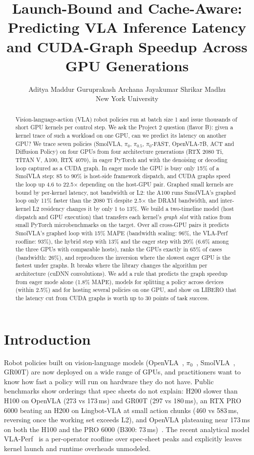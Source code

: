 \documentclass[10pt,twocolumn]{article}
\title{Launch-Bound and Cache-Aware: Predicting VLA Inference Latency\\
and CUDA-Graph Speedup Across GPU Generations}
\author{Aditya Maddur Guruprakash \quad Archana Jayakumar \quad Shrikar Madhu\\New York University}
\date{}
\begin{document}
\maketitle

\begin{abstract}
Vision-language-action (VLA) robot policies run at batch size 1 and issue thousands of short
GPU kernels per control step. We ask the Project 2 question (flavor B): given a kernel trace of
such a workload on one GPU, can we predict its latency on another GPU? We trace seven policies
(SmolVLA, $\pi_0$, $\pi_{0.5}$, $\pi_0$-FAST, OpenVLA-7B, ACT and Diffusion Policy) on four GPUs
from four architecture generations (RTX 2080 Ti, TITAN V, A100, RTX 4070), in eager PyTorch and
with the denoising or decoding loop captured as a CUDA graph. In eager mode the GPU is busy only
15\% of a SmolVLA step: 85 to 90\% is host-side framework dispatch, and CUDA graphs speed the
loop up 4.6 to 22.5$\times$ depending on the host-GPU pair. Graphed small kernels are bound by
per-kernel latency, not bandwidth or L2: the A100 runs SmolVLA's graphed loop only 11\% faster
than the 2080 Ti despite 2.5$\times$ the DRAM bandwidth, and inter-kernel L2 residency changes it
by only 1 to 13\%. We build a two-timeline model (host dispatch and GPU execution) that transfers
each kernel's \emph{graph slot} with ratios from small PyTorch microbenchmarks on the target.
Over all cross-GPU pairs it predicts SmolVLA's graphed loop with 15\% MAPE (bandwidth scaling:
96\%, the VLA-Perf roofline: 93\%), the hybrid step with 13\% and the eager step with 20\%
(6.6\% among the three GPUs with comparable hosts), ranks the GPUs exactly in 65\% of cases
(bandwidth: 26\%), and reproduces the inversion where the slowest eager GPU is the fastest under
graphs. It breaks where the library changes the algorithm per architecture (cuDNN convolutions).
We add a rule that predicts the graph speedup from eager mode alone (1.8\% MAPE), models for
splitting a policy across devices (within 2.5\%) and for hosting several policies on one GPU, and
show on LIBERO that the latency cut from CUDA graphs is worth up to 30 points of task success.
\end{abstract}

\section{Introduction}
Robot policies built on vision-language models (OpenVLA~\cite{openvla}, $\pi_0$~\cite{pi0},
SmolVLA~\cite{smolvla}, GR00T) are now deployed on a wide range of GPUs, and practitioners want
to know how fast a policy will run on hardware they do not have. Public benchmarks show orderings
that spec sheets do not explain: H200 slower than H100 on OpenVLA (273 vs 173\,ms) and GR00T
(297 vs 180\,ms), an RTX PRO 6000 beating an H200 on Lingbot-VLA at small action chunks (460 vs
583\,ms, reversing once the working set exceeds L2), and OpenVLA plateauing near 173\,ms on both
the H100 and the PRO 6000 (B300: 73\,ms)~\cite{yotta}. The recent analytical model VLA-Perf~\cite{vlaperf} is a per-operator
roofline over spec-sheet peaks and explicitly leaves kernel launch and runtime overheads
unmodeled.
\end{document}
